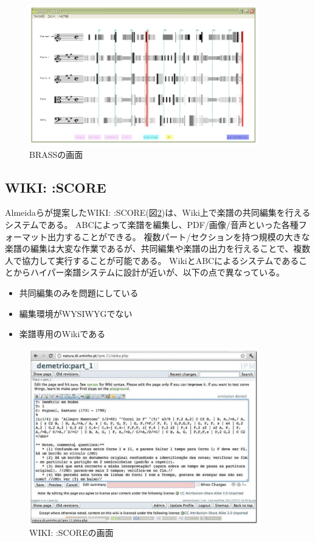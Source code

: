 \begin{figure}[H]
\centering
\includegraphics[width=10cm]{images/brass.png}
\caption{BRASSの画面}
\label{brass}
\end{figure}

\subsection{WIKI: :SCORE}
Almeidaらが提案したWIKI: :SCORE\cite{Almeida}(図\ref{wikiscore})は、Wiki上で楽譜の共同編集を行えるシステムである。
ABCによって楽譜を編集し、PDF/画像/音声といった各種フォーマット出力することができる。
複数パート/セクションを持つ規模の大きな楽譜の編集は大変な作業であるが、共同編集や楽譜の出力を行えることで、複数人で協力して実行することが可能である。
WikiとABCによるシステムであることからハイパー楽譜システムに設計が近いが、以下の点で異なっている。
\begin{itemize}
\item 共同編集のみを問題にしている
\item 編集環境がWYSIWYGでない
\item 楽譜専用のWikiである
\end{itemize}

\begin{figure}[H]
\centering
\includegraphics[width=10cm]{images/wikiscore.png}
\caption{WIKI: :SCOREの画面}
\label{wikiscore}
\end{figure}

